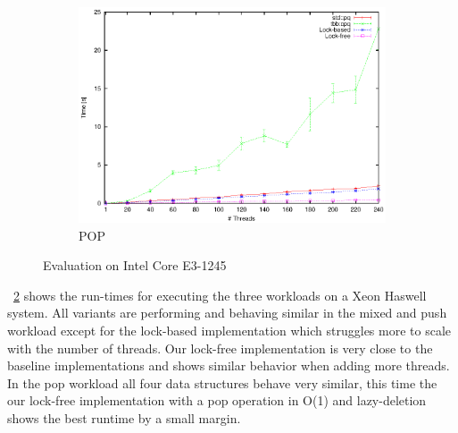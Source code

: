\begin{figure}[t]
\begin{subfigure}[b]{0.3\textwidth}
		\centering
		\includegraphics[width=\textwidth]{../plots/i7_pop/runtime_pop_i7}
		\caption{POP}
		\label{fig:i7_pop}
	\end{subfigure}
	\caption{Evaluation on Intel Core E3-1245}
	\label{fig:eval_i7}
\end{figure}
\figurename~\ref{fig:eval_i7} shows the run-times for executing the three workloads on a Xeon Haswell system. All variants are performing and behaving similar in the mixed and push workload except for the lock-based implementation which struggles more to scale with the number of threads. Our lock-free implementation is very close to the baseline implementations and shows similar behavior when adding more threads. In the pop workload all four data structures behave very similar, this time the our lock-free implementation with a pop operation in O(1) and lazy-deletion shows the best runtime by a small margin.

